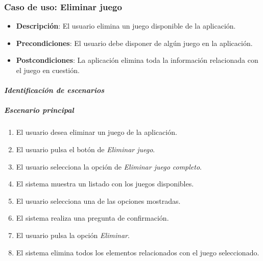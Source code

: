 \subsubsection{Caso de uso: Eliminar juego}
\begin{itemize}
    \item \textbf{Descripción}: El usuario elimina un juego disponible de la aplicación.
    \item \textbf{Precondiciones}: El usuario debe disponer de algún juego en la aplicación.
    \item \textbf{Postcondiciones}: La aplicación elimina toda la información relacionada 
    con el juego en cuestión.
\end{itemize}

\paragraph{\textit{Identificación de escenarios}}
\subparagraph{Escenario principal}
\begin{enumerate}
    \item El usuario desea eliminar un juego de la aplicación.
    \item El usuario pulsa el botón de \textit{Eliminar juego}.
    \item El usuario selecciona la opción de \textit{Eliminar juego completo}.
    \item El sistema muestra un listado con los juegos disponibles.
    \item El usuario selecciona una de las opciones mostradas.
    \item El sistema realiza una pregunta de confirmación.
    \item El usuario pulsa la opción \textit{Eliminar}.
    \item El sistema elimina todos los elementos relacionados con el juego seleccionado.
\end{enumerate}

